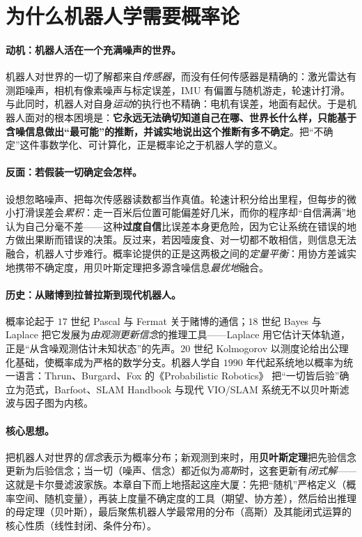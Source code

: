 \section{为什么机器人学需要概率论}
\label{sec:prob-why}

\paragraph{动机：机器人活在一个充满噪声的世界。}
机器人对世界的一切了解都来自\emph{传感器}，而没有任何传感器是精确的：激光雷达有测距噪声，相机有像素噪声与标定误差，IMU 有偏置与随机游走，轮速计打滑。与此同时，机器人对自身\emph{运动}的执行也不精确：电机有误差，地面有起伏。于是机器人面对的根本困境是：\textbf{它永远无法确切知道自己在哪、世界长什么样，只能基于含噪信息做出“最可能”的推断，并诚实地说出这个推断有多不确定}。把“不确定”这件事数学化、可计算化，正是概率论之于机器人学的意义。

\paragraph{反面：若假装一切确定会怎样。}
设想忽略噪声、把每次传感器读数都当作真值。轮速计积分给出里程，但每步的微小打滑误差会\emph{累积}：走一百米后位置可能偏差好几米，而你的程序却“自信满满”地认为自己分毫不差——这种\textbf{过度自信}比误差本身更危险，因为它让系统在错误的地方做出果断而错误的决策。反过来，若因噎废食、对一切都不敢相信，则信息无法融合，机器人寸步难行。概率论提供的正是这两极之间的\emph{定量平衡}：用协方差诚实地携带不确定度，用贝叶斯定理把多源含噪信息\emph{最优地}融合。

\paragraph{历史：从赌博到拉普拉斯到现代机器人。}
概率论起于 $17$ 世纪 Pascal 与 Fermat 关于赌博的通信；$18$ 世纪 Bayes 与 Laplace 把它发展为\emph{由观测更新信念}的推理工具——Laplace 用它估计天体轨道，正是“从含噪观测估计未知状态”的先声。$20$ 世纪 Kolmogorov 以测度论给出公理化基础\cite{bishop2006prml}，使概率成为严格的数学分支。机器人学自 $1990$ 年代起系统地以概率为统一语言：Thrun、Burgard、Fox 的《Probabilistic Robotics》\cite{thrun2005probabilistic} 把“一切皆后验”确立为范式，Barfoot\cite{barfoot2024state}、SLAM Handbook 与现代 VIO/SLAM 系统无不以贝叶斯滤波与因子图为内核。

\paragraph{核心思想。}
把机器人对世界的\emph{信念}表示为概率分布；新观测到来时，用\textbf{贝叶斯定理}把先验信念更新为后验信念；当一切（噪声、信念）都近似为\emph{高斯}时，这套更新有\emph{闭式解}——这就是卡尔曼滤波家族。本章自下而上地搭起这座大厦：先把“随机”严格定义（概率空间、随机变量），再装上度量不确定度的工具（期望、协方差），然后给出推理的母定理（贝叶斯），最后聚焦机器人学最常用的分布（高斯）及其能闭式运算的核心性质（线性封闭、条件分布）。

